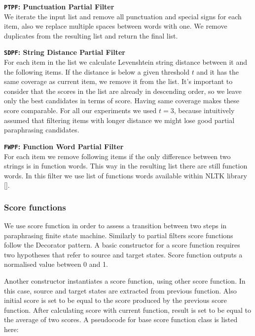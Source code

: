 \begin{flushleft}

\textbf{\texttt{PTPF}: \textbf{Punctuation Partial Filter}} \\
We iterate the input list and remove all punctuation and special signs for each item, also we replace multiple spaces between words with one. We remove duplicates from the resulting list and return the final list.\\
\bigskip 

\textbf{\texttt{SDPF}: \textbf{String Distance Partial Filter}} \\
For each item in the list we calculate Levenshtein string distance between it and the following items. If the distance is below a given threshold $t$ and it has the same coverage as current item, we remove it from the list. It's important to consider that the scores in the list are already in descending order, so we leave only the best candidates in terms of score. Having same coverage makes these score comparable. For all our experiments we used $t = 3$, because intuitively assumed that filtering items with longer distance we might lose good partial paraphrasing candidates. \\
\bigskip 

\textbf{\texttt{FWPF}: \textbf{Function Word Partial Filter}} \\
For each item we remove following items if the only difference between two strings is in function words. This way in the resulting list there are still function words. In this filter we use list of functions words available within NLTK library []. \\
\bigskip 

\end{flushleft} 

\subsubsection{Score functions}

We use score function in order to assess a transition between two steps in paraphrasing finite state machine. Similarly to partial filters score functions follow the Decorator pattern. A basic constructor for a score function requires two hypotheses that refer to source and target states. Score function outputs a normalised value between 0 and 1. 

Another constructor instantiates a score function, using other score function. In this case, source and target states are extracted from previous function. Also initial score is set to be equal to the score produced by the previous score function. After calculating score with current function, result is set to be equal to the average of two scores. A pseudocode for base score function class is listed here:

